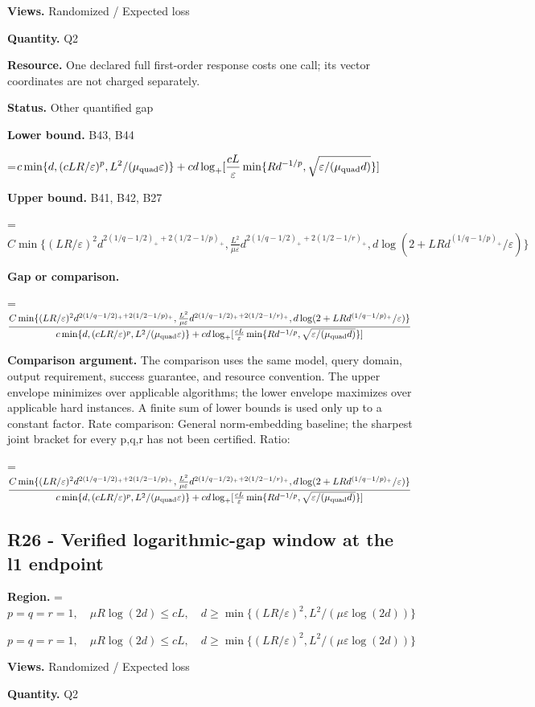 \documentclass[10pt,a4paper]{article}
\newcommand{\AtlasMath}[1]{\par\begingroup\centering\setbox0=\hbox{$\displaystyle #1$}\ifdim\wd0>1.4\linewidth\typeout{ATLAS WIDE FORMULA: \the\wd0}\fi\ifdim\wd0>\linewidth\resizebox{\linewidth}{!}{\box0}\else\box0\fi\par\endgroup}
\newcommand{\AtlasInlineMath}[1]{\begingroup\setbox0=\hbox{$#1$}\ifdim\wd0>.4\linewidth\endgroup\AtlasMath{#1}\else\endgroup$#1$\fi}
\begin{document}
\textbf{Views.} Randomized / Expected loss

\textbf{Quantity.} Q2

\textbf{Resource.} One declared full first-order response costs one call; its vector coordinates are not charged separately.

\textbf{Status.} Other quantified gap

\textbf{Lower bound.} B43, B44

\AtlasMath{c\min\{d,(cLR/\varepsilon)^p,L^2/(\mu_{\rm quad}\varepsilon)\}+cd\log_+[\frac{cL}{\varepsilon}\min\{Rd^{-1/p},\sqrt{\varepsilon/(\mu_{\rm quad}d)}\}]}
\textbf{Upper bound.} B41, B42, B27

\AtlasMath{C\min\{(LR/\varepsilon)^2d^{2(1/q-1/2)_++2(1/2-1/p)_+},\frac{L^2}{\mu\varepsilon}d^{2(1/q-1/2)_++2(1/2-1/r)_+},d\log(2+LRd^{(1/q-1/p)_+}/\varepsilon)\}}
\textbf{Gap or comparison.} 
\AtlasMath{\frac{C\min\{(LR/\varepsilon)^2d^{2(1/q-1/2)_++2(1/2-1/p)_+},\frac{L^2}{\mu\varepsilon}d^{2(1/q-1/2)_++2(1/2-1/r)_+},d\log(2+LRd^{(1/q-1/p)_+}/\varepsilon)\}}{c\min\{d,(cLR/\varepsilon)^p,L^2/(\mu_{\rm quad}\varepsilon)\}+cd\log_+[\frac{cL}{\varepsilon}\min\{Rd^{-1/p},\sqrt{\varepsilon/(\mu_{\rm quad}d)}\}]}}


\textbf{Comparison argument.} The comparison uses the same model, query domain, output requirement, success guarantee, and resource convention. The upper envelope minimizes over applicable algorithms; the lower envelope maximizes over applicable hard instances. A finite sum of lower bounds is used only up to a constant factor. Rate comparison: General norm-embedding baseline; the sharpest joint bracket for every p,q,r has not been certified. Ratio: 
\AtlasMath{\frac{C\min\{(LR/\varepsilon)^2d^{2(1/q-1/2)_++2(1/2-1/p)_+},\frac{L^2}{\mu\varepsilon}d^{2(1/q-1/2)_++2(1/2-1/r)_+},d\log(2+LRd^{(1/q-1/p)_+}/\varepsilon)\}}{c\min\{d,(cLR/\varepsilon)^p,L^2/(\mu_{\rm quad}\varepsilon)\}+cd\log_+[\frac{cL}{\varepsilon}\min\{Rd^{-1/p},\sqrt{\varepsilon/(\mu_{\rm quad}d)}\}]}}


\subsection{R26 - Verified logarithmic-gap window at the l1 endpoint}
\textbf{Region.} \AtlasInlineMath{p=q=r=1,\quad\mu R\log(2d)\le cL,\quad d\ge\min\{(LR/\varepsilon)^2,L^2/(\mu\varepsilon\log(2d))\}}

\textbf{Views.} Randomized / Expected loss

\textbf{Quantity.} Q2
\end{document}
